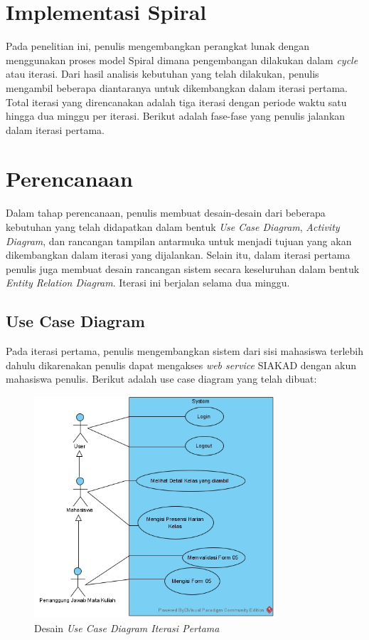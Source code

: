 \section{Implementasi Spiral}


Pada penelitian ini, penulis mengembangkan perangkat lunak dengan menggunakan proses model Spiral dimana pengembangan dilakukan dalam \emph{cycle} atau iterasi. Dari hasil analisis kebutuhan yang telah dilakukan, penulis mengambil beberapa diantaranya untuk dikembangkan dalam iterasi pertama. Total iterasi yang direncanakan adalah tiga iterasi dengan periode waktu satu hingga dua minggu per iterasi. Berikut adalah fase-fase yang penulis jalankan dalam iterasi pertama.

\section{Perencanaan}

Dalam tahap perencanaan, penulis membuat desain-desain dari beberapa kebutuhan yang telah didapatkan dalam bentuk \textit{Use Case Diagram}, \textit{Activity Diagram}, dan rancangan tampilan antarmuka untuk menjadi tujuan yang akan dikembangkan dalam iterasi yang dijalankan. Selain itu, dalam iterasi pertama penulis juga membuat desain rancangan sistem secara keseluruhan dalam bentuk \textit{Entity Relation Diagram}. Iterasi ini berjalan selama dua minggu.

\subsection{Use Case Diagram}

Pada iterasi pertama, penulis mengembangkan sistem dari sisi mahasiswa terlebih dahulu dikarenakan penulis dapat mengakses \textit{web service} SIAKAD dengan akun mahasiswa penulis. Berikut adalah use case diagram yang telah dibuat:

\begin{figure}[H]
	\centering
	\includegraphics[width=0.8\textwidth]{gambar/diagram/Use Case Iteration 1}
	\caption{Desain \textit{Use Case Diagram Iterasi Pertama}}
	\label{fig:usecase1st}
\end{figure}

